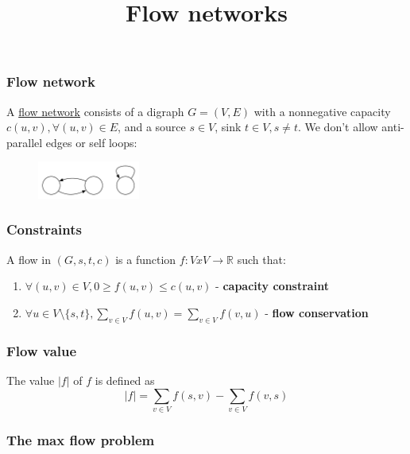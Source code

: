 \documentclass[12pt]{article}
\newcommand{\assignmentname}{Flow networks}
\begin{document}
\title{\assignmentname}

\maketitle
\thispagestyle{empty}

\subsubsection*{Flow network}

A \underline{flow network} consists of a digraph $G = (V, E)$ with a nonnegative capacity $c(u,v), \forall (u,v) \in E$, and a source $s \in V$, sink $ t\in V, s \neq t$.
We don't allow anti-parallel edges or self loops:

\begin{figure}[h]
  \centering
    \includegraphics[width=0.3\textwidth]{figures/1}
\end{figure}

\subsubsection*{Constraints}

A flow in $(G, s, t, c)$ is a function $f: VxV \rightarrow \mathbb{R}$ such that:

\begin{enumerate}
  \item $\forall (u,v) \in V, 0 \geq f(u,v) \leq c(u,v)$ - \textbf{capacity constraint}
  \item $\forall u \in V \setminus \{s, t\}, \sum_{v\in V} f(u,v) = \sum_{v \in V} f(v,u)$ - \textbf{flow conservation}
\end{enumerate}

\subsubsection*{Flow value}

The value $|f|$ of $f$ is defined as $$|f| = \sum_{v \in V} f(s,v) - \sum_{v \in V} f(v, s)$$

\subsubsection*{The max flow problem}
\end{document}
